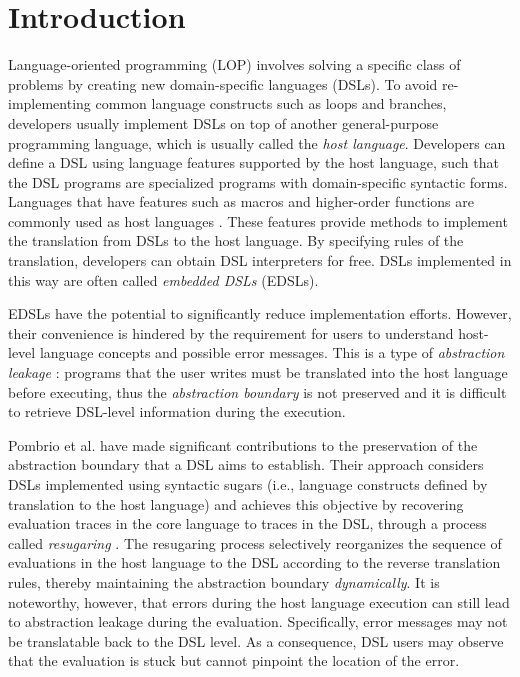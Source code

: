 \section{Introduction}
\label{sec:intro}

Language-oriented programming (LOP) \cite{LOP} involves solving a specific class of problems by creating new domain-specific languages (DSLs). To avoid re-implementing common language constructs such as loops and branches, developers usually implement DSLs on top of another general-purpose programming language, which is usually called the \textit{host language}. Developers can define a DSL using language features supported by the host language, such that the DSL programs are specialized programs with domain-specific syntactic forms. Languages that have features such as macros and higher-order functions are commonly used as host languages \cite{macro-dsl, macro-dsl-2}. These features provide methods to implement the translation from DSLs to the host language. By specifying rules of the translation, developers can obtain DSL interpreters for free. DSLs implemented in this way are often called \emph{embedded DSLs} (EDSLs).

EDSLs have the potential to significantly reduce implementation efforts. However, their convenience is hindered by the requirement for users to understand host-level language concepts and possible error messages. This is a type of \textit{abstraction leakage} \cite{Abstraction}: programs that the user writes must be translated into the host language before executing, thus the \emph{abstraction boundary} is not preserved and it is difficult to retrieve DSL-level information during the execution.

Pombrio et al. have made significant contributions to the preservation of the abstraction boundary that a DSL aims to establish.
Their approach considers DSLs implemented using syntactic sugars (i.e., language constructs defined by translation to the host language) and achieves this objective by recovering evaluation traces in the core language to traces in the DSL, 
through a process called \emph{resugaring} \cite{resugar}. The resugaring process selectively reorganizes the sequence of evaluations in the host language to the DSL according to the reverse translation rules, thereby maintaining the abstraction boundary \textit{dynamically}. It is noteworthy, however, that errors during the host language execution can still lead to abstraction leakage during the evaluation. Specifically, error messages may not be translatable back to the DSL level. As a consequence, DSL users may observe that the evaluation is stuck but cannot pinpoint the location of the error.

